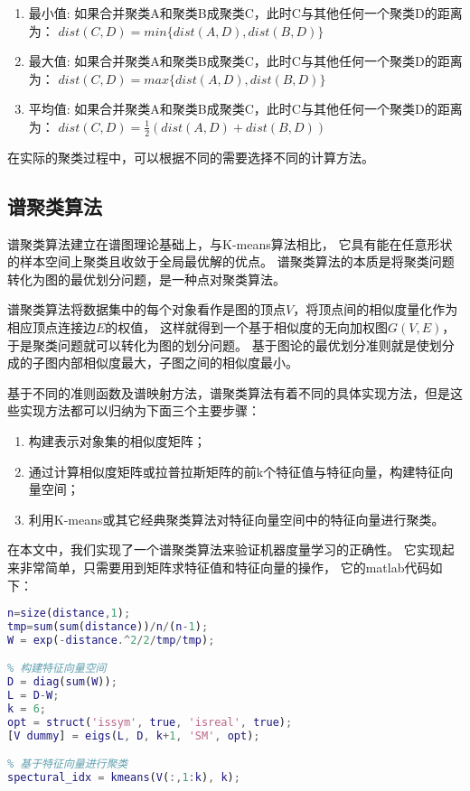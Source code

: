 \begin{enumerate}
    \item 最小值: 如果合并聚类A和聚类B成聚类C，此时C与其他任何一个聚类D的距离为：
        $dist(C, D) = min\{dist(A, D), dist(B, D)\}$
    \item 最大值: 如果合并聚类A和聚类B成聚类C，此时C与其他任何一个聚类D的距离为：
        $dist(C, D) = max\{dist(A, D), dist(B, D)\}$
    \item 平均值: 如果合并聚类A和聚类B成聚类C，此时C与其他任何一个聚类D的距离为：
        $dist(C, D) = \frac{1}{2}(dist(A, D) + dist(B, D))$
\end{enumerate}

在实际的聚类过程中，可以根据不同的需要选择不同的计算方法。

\subsection{谱聚类算法}

谱聚类算法建立在谱图理论基础上，与K-means算法相比，
它具有能在任意形状的样本空间上聚类且收敛于全局最优解的优点。
谱聚类算法的本质是将聚类问题转化为图的最优划分问题，是一种点对聚类算法。

谱聚类算法将数据集中的每个对象看作是图的顶点$V$，将顶点间的相似度量化作为相应顶点连接边$E$的权值，
这样就得到一个基于相似度的无向加权图$G(V, E)$，于是聚类问题就可以转化为图的划分问题。
基于图论的最优划分准则就是使划分成的子图内部相似度最大，子图之间的相似度最小。

基于不同的准则函数及谱映射方法，谱聚类算法有着不同的具体实现方法，但是这些实现方法都可以归纳为下面三个主要步骤：

\begin{enumerate}
    \item 构建表示对象集的相似度矩阵；
    \item 通过计算相似度矩阵或拉普拉斯矩阵的前k个特征值与特征向量，构建特征向量空间；
    \item 利用K-means或其它经典聚类算法对特征向量空间中的特征向量进行聚类。
\end{enumerate}

在本文中，我们实现了一个谱聚类算法来验证机器度量学习的正确性。
它实现起来非常简单，只需要用到矩阵求特征值和特征向量的操作，
它的matlab代码如下：

\begin{lstlisting}[language={matlab}, caption={谱聚类算法的简单实现}]
% 将距离矩阵转换为相似度矩阵
n=size(distance,1);
tmp=sum(sum(distance))/n/(n-1);
W = exp(-distance.^2/2/tmp/tmp);

% 构建特征向量空间
D = diag(sum(W));
L = D-W;
k = 6;
opt = struct('issym', true, 'isreal', true);
[V dummy] = eigs(L, D, k+1, 'SM', opt);

% 基于特征向量进行聚类
spectural_idx = kmeans(V(:,1:k), k);

\end{lstlisting}
